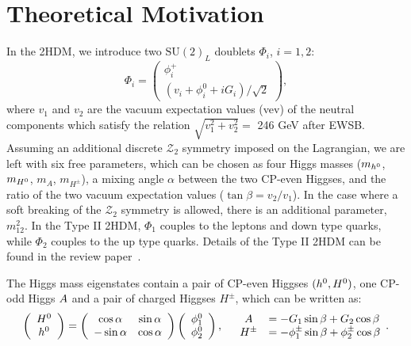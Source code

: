  
 
\section{Theoretical Motivation}
\label{sec:motivation}

In the 2HDM,  we introduce two $\text{SU}(2)_L$ doublets   $\Phi_{i}$,  $i=1,2$:
 \begin{equation}
\Phi_{i}=\begin{pmatrix} 
  \phi_i^{+}    \\ 
  (v_i+\phi^{0}_i+iG_i)/\sqrt{2}  
\end{pmatrix},
\label{eq:doublet}
\end{equation} 
where $v_1$ and $v_2$ are the vacuum expectation values (vev) of the neutral components which satisfy the relation $\sqrt{v_1^2+v_2^2}=$ 246 GeV after EWSB.  Assuming an additional discrete $\mathcal{Z}_2$ symmetry imposed on the Lagrangian,  we are left with six free parameters, which can be chosen as    four Higgs masses ($m_{h^0}$, $m_{H^0}$, $m_A$, $m_{H^{\pm}}$), a mixing angle $\alpha$ between the two CP-even Higgses, and the ratio of the two vacuum expectation values ($\tan\beta=v_2/v_1$).   In the case where a soft breaking of the $\mathcal{Z}_2$ symmetry is allowed, there is an additional parameter, $m_{12}^2$.    In the Type II 2HDM, $\Phi_1$ couples to the leptons and down type quarks, while $\Phi_2$ couples to the up type quarks.  Details of the Type II 2HDM can be found in the review paper~\cite{Branco:2011iw}.

The Higgs mass eigenstates contain a pair of CP-even Higgses $(h^0, H^0)$, one CP-odd Higgs $A$ and  a pair of charged Higgses $H^\pm$, which  can be written as:
\begin{equation}
\left(\begin{array}{c}
\H\\ \h
\end{array}
\right)
=\left(
\begin{array}{cc}
\cos\alpha &\sin\alpha\\
-\sin\alpha&\cos\alpha
\end{array}
\right)  \left(
\begin{array}{c}
\phi_1^0\\\phi_2^0
\end{array}
\right),\ \ \ 
\begin{array}{c}
 A \\H^\pm
 \end{array}
 \begin{array}{l}
 =  -G_1\sin\beta+G_2\cos\beta\\
 =-\phi_1^{\pm}\sin\beta+\phi_2^{\pm} \cos\beta
 \end{array}.
 \label{eq:mass}
 \end{equation}

